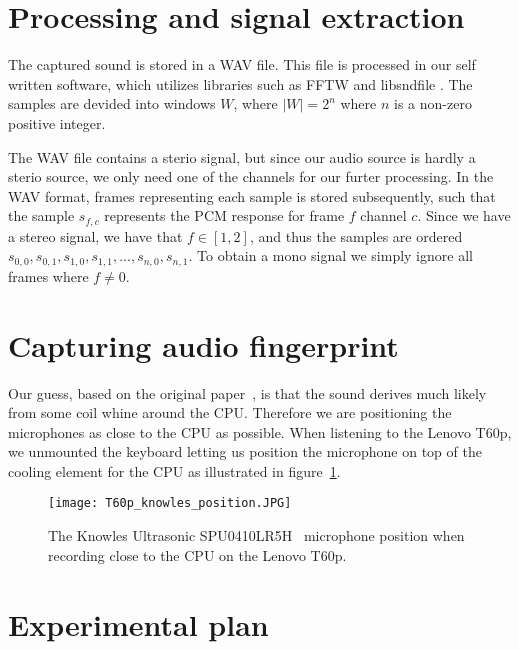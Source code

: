 \section{Processing and signal extraction}\label{sec:ch3_processing_signal_extraction}

The captured sound is stored in a WAV file.
This file is processed in our self written software, which utilizes libraries such as FFTW  and libsndfile .
The samples are devided into windows \( W \), where \( \lvert W \rvert = 2^{n} \) where \( n \) is a non-zero positive integer.

The WAV file contains a sterio signal, but since our audio source is hardly a sterio source, we only need one of the channels for our furter processing.  
In the WAV format, frames representing each sample is stored subsequently, such that the sample \( s_{f,c} \) represents the PCM  response for frame \( f \) channel \( c \). 
Since we have a stereo signal, we have that \( f \in \left [ 1, 2 \right ]  \), and thus the samples are ordered  \( s_{0,0}, s_{0,1}, s_{1,0}, s_{1,1}, ... , s_{n,0}, s_{n,1} \). 
To obtain a mono signal we simply ignore all frames where \( f \neq 0 \).

\section{Capturing audio fingerprint}\label{sec:ch3_capturing_audio_fingerprint}

Our guess, based on the original paper~\cite{original_paper}, is that the sound derives much likely from some coil whine around the CPU. 
Therefore we are positioning the microphones as close to the CPU as possible. 
When listening to the Lenovo T60p, we unmounted the keyboard letting us position the microphone on top of the cooling element for the CPU as illustrated in figure~\ref{fig:T60p_knowles_position}. 
\begin{figure}[h]
    \centering
    \texttt{[image: T60p\_knowles\_position.JPG]}
    \caption{The Knowles Ultrasonic SPU0410LR5H~\cite{knowles_spec} microphone position when recording close to the CPU on the Lenovo T60p.}
    \label{fig:T60p_knowles_position}
\end{figure}

\section{Experimental plan}\label{sec:ch3_experimental_plan}

